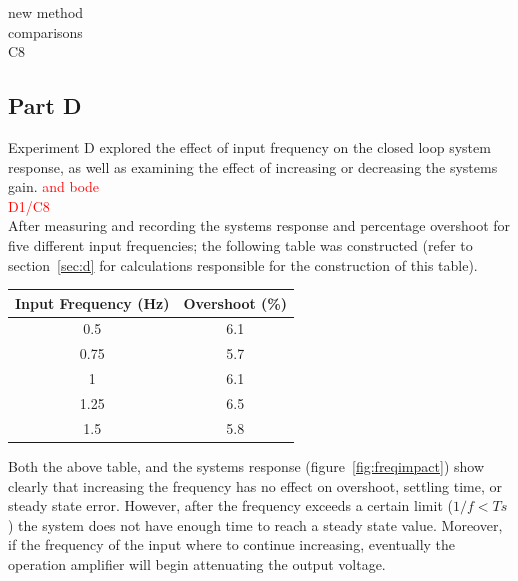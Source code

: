 \documentclass[11pt,a4paper]{article}
\begin{document}
new method\\
comparisons\\
C8\\







\pagebreak
\subsection{Part D}
Experiment D explored the effect of input frequency on the closed loop system response, as well as examining the effect of increasing or decreasing the systems gain. \textcolor{red}{and bode}\\
  
\textcolor{red}{D1/C8} \\

After measuring and recording the systems response and percentage overshoot for five different input frequencies; the following table was constructed (refer to section~\ref{sec:d} for calculations responsible for the construction of this table). 

\begin{center}
    \begin{tabular}{| c | c |}
    \hline
    Input Frequency (Hz)  & Overshoot (\%)  \\ \hline
    0.5  	                  & 6.1  		\\ \hline
	0.75  	                  & 5.7  		\\ \hline
	1		                  & 6.1 		\\ \hline
	1.25	                  & 6.5 		\\ \hline
	1.5		                  & 5.8 		\\
    \hline
    \end{tabular}
\end{center}
 
Both the above table, and the systems response (figure~\ref{fig:freqimpact}) show clearly that increasing the frequency has no effect on overshoot, settling time, or steady state error. However, after the frequency exceeds a certain limit (\textbf{$1/f < Ts$}) the system does not have enough time to reach a steady state value. Moreover, if the frequency of the input where to continue increasing, eventually the operation amplifier will begin attenuating the output voltage. 
\end{document}
